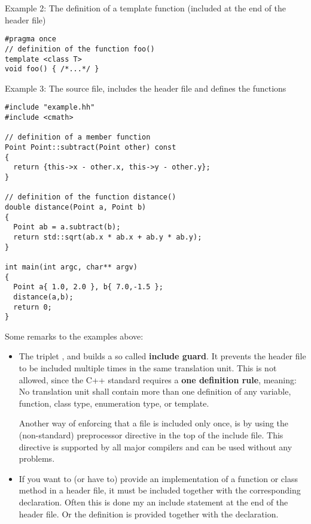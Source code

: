 Example 2: The definition of a template function (included at the end of the header file)

\begin{verbatim}
#pragma once
// definition of the function foo()
template <class T>
void foo() { /*...*/ }
\end{verbatim}

Example 3: The source file, includes the header file and defines the functions

\begin{verbatim}
#include "example.hh"
#include <cmath>

// definition of a member function
Point Point::subtract(Point other) const
{
  return {this->x - other.x, this->y - other.y};
}

// definition of the function distance()
double distance(Point a, Point b)
{
  Point ab = a.subtract(b);
  return std::sqrt(ab.x * ab.x + ab.y * ab.y);
}

int main(int argc, char** argv)
{
  Point a{ 1.0, 2.0 }, b{ 7.0,-1.5 };
  distance(a,b);
  return 0;
}
\end{verbatim}


Some remarks to the examples above:
\begin{itemize}
  \item The triplet ,  and  builds a so called \textbf{include guard}. It prevents the header file
    to be included multiple times in the same translation unit. This is not allowed, since the C++ standard requires a \textbf{one definition rule},
    meaning: No translation unit shall contain more than one definition of any variable, function, class type, enumeration type, or template.

    Another way of enforcing that a file is included only once, is by using the (non-standard) preprocessor directive  in the
    top of the include file. This directive is supported by all major compilers and can be used without any problems.

  \item If you want to (or have to) provide an implementation of a function or class method in a header file, it must be included together with
    the corresponding declaration. Often this is done my an include statement at the end of the header file. Or the definition is provided
    together with the declaration.
\end{itemize}


